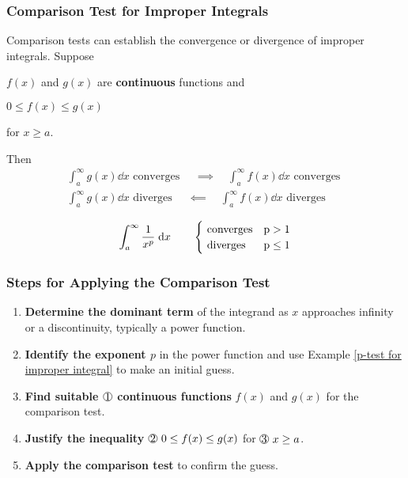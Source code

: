 \subsubsection{Comparison Test for Improper Integrals}

Comparison tests can establish the convergence or divergence of improper integrals.
Suppose \begin{enumerate*}[label = \circled{\arabic*}]
    \item $f(x)$ and $g(x)$ are \textbf{continuous} functions and \item $0 \leq f(x) \leq g(x)$ 
    \item for $x \geq a$.
\end{enumerate*}
Then
\begin{align*}
    \int_a^\infty g(x) \dd x \text{ converges } \quad \boldsymbol{\implies} \quad \int_a^\infty f(x) \dd x \text{ converges } \\
    \int_a^\infty g(x) \dd x \text{ diverges } \quad \boldsymbol{\impliedby} \quad \int_a^\infty f(x) \dd x \text{ diverges } 
\end{align*}

\begin{ex} \label{p-test for improper integral}
    \begin{align*}
        \int_a^\infty \dfrac{1}{x^p} \;\mathrm{d} x \qquad \begin{cases}
            \text{ converges} & \text p > 1\\
            \text{ diverges} & \text p \leq 1
        \end{cases}
    \end{align*}
\end{ex}



\subsubsection{Steps for Applying the Comparison Test}
\begin{enumerate}
    \item \textbf{Determine the dominant term} of the integrand as $x$ approaches infinity or a discontinuity, typically a power function.  
    \item \textbf{Identify the exponent $p$} in the power function and use Example \ref{p-test for improper integral} to make an initial guess.  
    \item \textbf{Find suitable $\circled{1}$ continuous functions} $f(x)$ and $g(x)$ for the comparison test.  
    \item \textbf{Justify the inequality} $\circled{2}~0 \leq f(x) \leq g(x)$ for $\circled{3}~x \geq a$. 
    \item \textbf{Apply the comparison test} to confirm the guess.  
\end{enumerate}



